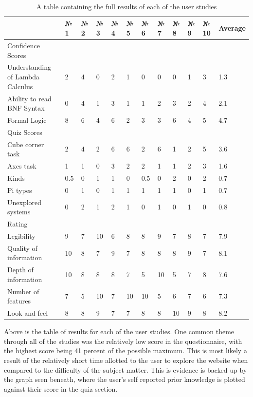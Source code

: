 \documentclass{l4proj}
\begin{document}
\begin{table}[!ht]
    \centering
    \begin{tabular}{|p{3cm}|l|l|l|l|l|l|l|l|l|l|l|}
        \hline
        ~ &  № 1 &  № 2 &  № 3 &  № 4 &  № 5 &  № 6 &  № 7 &  № 8 &  № 9 &  № 10 & Average \\ \hline
        Confidence Scores & ~ & ~ & ~ & ~ & ~ & ~ & ~ & ~ & ~ & ~ & ~ \\ \hline
        Understanding of Lambda Calculus & 2 & 4 & 0 & 2 & 1 & 0 & 0 & 0 & 1 & 3 & 1.3 \\ \hline
        Ability to read BNF Syntax & 0 & 4 & 1 & 3 & 1 & 1 & 2 & 3 & 2 & 4 & 2.1 \\ \hline
        Formal Logic & 8 & 6 & 4 & 6 & 2 & 3 & 3 & 6 & 4 & 5 & 4.7 \\ \hline
        Quiz Scores & ~ & ~ & ~ & ~ & ~ & ~ & ~ & ~ & ~ & ~ & ~ \\ \hline
        Cube corner task & 2 & 4 & 2 & 6 & 6 & 2 & 6 & 1 & 2 & 5 & 3.6 \\ \hline
        Axes task & 1 & 1 & 0 & 3 & 2 & 2 & 1 & 1 & 2 & 3 & 1.6 \\ \hline
        Kinds & 0.5 & 0 & 1 & 1 & 0 & 0.5 & 0 & 2 & 0 & 2 & 0.7 \\ \hline
        Pi types & 0 & 1 & 0 & 1 & 1 & 1 & 1 & 1 & 0 & 1 & 0.7 \\ \hline
        Unexplored systems & 0 & 2 & 1 & 2 & 1 & 0 & 1 & 0 & 1 & 0 & 0.8 \\ \hline
        Rating & ~ & ~ & ~ & ~ & ~ & ~ & ~ & ~ & ~ & ~ & ~ \\ \hline
        Legibility & 9 & 7 & 10 & 6 & 8 & 8 & 9 & 7 & 8 & 7 & 7.9 \\ \hline
        Quality of information & 10 & 8 & 7 & 9 & 7 & 8 & 8 & 8 & 9 & 7 & 8.1 \\ \hline
        Depth of information & 10 & 8 & 8 & 8 & 7 & 5 & 10 & 5 & 7 & 8 & 7.6 \\ \hline
        Number of features & 7 & 5 & 10 & 7 & 10 & 10 & 5 & 6 & 7 & 6 & 7.3 \\ \hline
        Look and feel & 8 & 8 & 9 & 7 & 7 & 8 & 8 & 10 & 9 & 8 & 8.2 \\ \hline
    \end{tabular}
    \caption{A table containing the full results of each of the user studies}
    \label{fig:enter-label}
\end{table}

Above is the table of results for each of the user studies.  One common theme through all of the studies was the relatively low score in the questionnaire, with the highest score being 41 percent of the possible maximum.  This is most likely a result of the relatively short time allotted to the user to explore the website when compared to the difficulty of the subject matter.  This is evidence is backed up by the graph seen beneath, where the user's self reported prior knowledge is plotted against their score in the quiz section.
\end{document}
